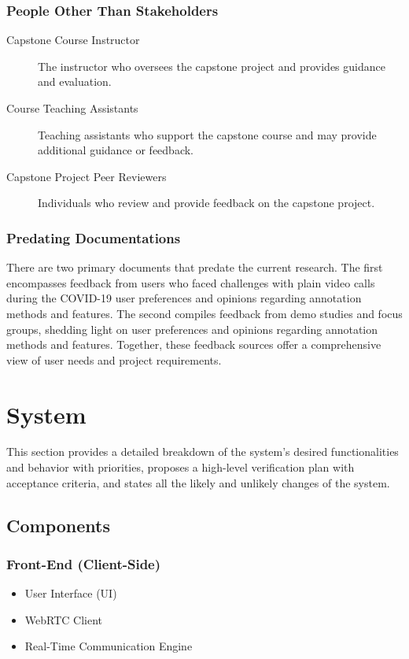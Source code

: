 \documentclass[12pt]{article}
\begin{document}
\subsubsection{People Other Than Stakeholders}
\begin{description}
    \item[Capstone Course Instructor] The instructor who oversees the capstone project and provides guidance and evaluation.
    \item[Course Teaching Assistants] Teaching assistants who support the capstone course and may provide additional guidance or feedback.
    \item[Capstone Project Peer Reviewers] Individuals who review and provide feedback on the capstone project.
\end{description}

\subsubsection{Predating Documentations}
There are two primary documents that predate the current research. The first encompasses feedback from users who faced challenges with plain video calls during the COVID-19 user preferences and opinions regarding annotation methods and features. The second compiles feedback from demo studies and focus groups, shedding light on user preferences and opinions regarding annotation methods and features. Together, these feedback sources offer a comprehensive view of user needs and project requirements. 

\section{System}
This section provides a detailed breakdown of the system’s desired functionalities and behavior with priorities, proposes a high-level verification plan with acceptance criteria, and states all the likely and unlikely changes of the system.
\subsection{Components}
\subsubsection{Front-End (Client-Side)}
\begin{itemize}
    \item User Interface (UI)
    \item WebRTC Client
    \item Real-Time Communication Engine
\end{itemize}
\end{document}
